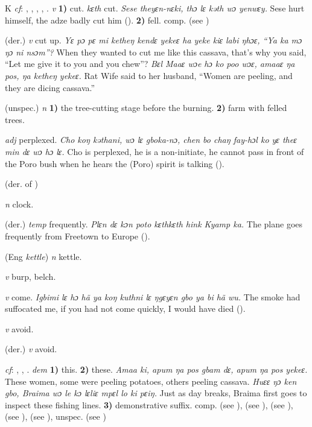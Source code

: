 \begin{letter}{K}
 \textit{cf}: , , , , . \textit{v} \textbf{1)} cut. \textit{kɛth} cut. \textit{Sese theyɛn-nɛki, thɔ lɛ kəth wɔ yenwɛy.} Sese hurt himself, the adze badly cut him (\citealt{Pichl1967}). \textbf{2)} fell. comp.  (see )

 (der.) \textit{v} cut up. \textit{Yɛ pɔ pɛ mi ketheŋ kendɛ yekeɛ ha yeke kiɛ labi ŋhɔɛ, “Ya ka mɔ ŋɔ ni nsɔm”?} When they wanted to cut me like this cassava, that's why you said, “Let me give it to you and you chew”? \textit{Bɛl Maaɛ wɔe hɔ ko poo wɔɛ, amaaɛ ŋa pos, ŋa ketheŋ yekeɛ.} Rat Wife said to her husband, “Women are peeling, and they are dicing cassava.”

 (unspec.) \textit{n} \textbf{1)} the tree-cutting stage before the burning. \textbf{2)} farm with felled trees. 

 \textit{adj} perplexed. \textit{Cho koŋ kəthani, wɔ lɛ gboka-nɔ, chen bo chaŋ fay-hɔl ko yɛ theɛ min dɛ wɔ hɔ lɛ.} Cho is perplexed, he is a non-initiate, he cannot pass in front of the Poro bush when he hears the (Poro) spirit is talking (\citealt{Pichl1967}).

 (der. of ) 

 \textit{n} clock.

 (der.) \textit{temp} frequently. \textit{Plɛn dɛ kɔn poto kɛthkɛth hink Kyamp ka.} The plane goes frequently from Freetown to Europe (\citealt{Pichl1967}). 

 (Eng \textit{kettle}) \textit{n} kettle.

 \textit{v} burp, belch.

 \textit{v} come. \textit{Igbimi lɛ hɔ hã ya koŋ kuthni lɛ ŋgɛyɛn gbo ya bi hã wu.} The smoke had suffocated
me, if you had not come quickly, I would have died (\citealt{Pichl1967}). 

 \textit{v} avoid.

 (der.) \textit{v} avoid.

 \textit{cf}: , , . \textit{dem} \textbf{1)} this. \textbf{2)} these. \textit{Amaa ki, apum ŋa pos gbam dɛ, apum ŋa pos yekeɛ.} These women, some were peeling potatoes, others peeling cassava. \textit{Huɛɛ ŋɔ ken gbo, Braima wɔ le kɔ lɛliɛ mpɛl lo ki pɛiŋ.} Just as day breaks, Braima first goes to inspect these fishing lines. \textbf{3)} demonstrative suffix. comp.  (see ),  (see ),  (see ),  (see ),  (see ), unspec.  (see ) 


\end{letter}
